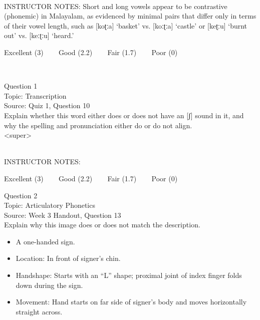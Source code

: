 \documentclass[12pt]{article}
\begin{document}
~\\
INSTRUCTOR NOTES: Short and long vowels appear to be contrastive (phonemic) in Malayalam, as evidenced by minimal pairs that differ only in terms of their vowel length, such as [koʈːa] ‘basket’ vs. [koːʈːa] ‘castle’ or [keʈːu] ‘burnt out’ vs. [keːʈːu] ‘heard.’


\vfill
Excellent (3) ~~~ Good (2.2) ~~~ Fair (1.7) ~~~ Poor (0)
\newpage

\begin{center}
\textbf{{\color{red}{\HUGE END OF EXAM}}}\\

\end{center}
\newpage

\begin{center}
\textbf{{\color{blue}{\HUGE START OF EXAM\\}}}

\textbf{{\color{blue}{\HUGE Student ID: 66007\\}}}

\textbf{{\color{blue}{\HUGE \\}}}

\end{center}
\newpage

{\large Question 1}\\

Topic: Transcription\\
Source: Quiz 1, Question 10\\

Explain whether this word either does or does not have an [ʃ] sound in it, and why the spelling and pronunciation either do or do not align.\\

<super>


~\\
INSTRUCTOR NOTES: 


\vfill
Excellent (3) ~~~ Good (2.2) ~~~ Fair (1.7) ~~~ Poor (0)
\newpage

{\large Question 2}\\

Topic: Articulatory Phonetics\\
Source: Week 3 Handout, Question 13\\

Explain why this image does or does not match the description.\\

\begin{itemize} \item A one-handed sign. \item Location: In front of signer’s chin. \item Handshape: Starts with an “L” shape; proximal joint of index finger folds down during the sign. \item Movement: Hand starts on far side of signer’s body and moves horizontally straight across. \end{itemize}
\end{document}
